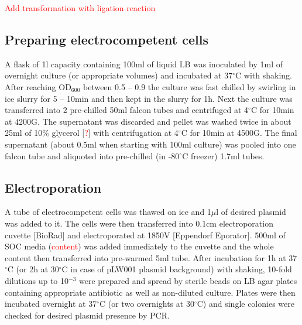 \textcolor{red}{Add transformation with ligation reaction}

\subsection{Preparing electrocompetent cells}
A flask of 1l capacity containing 100ml of liquid LB was inoculated by 1ml of overnight culture (or appropriate volumes) and incubated at 37$^{\circ}$C with shaking.
After reaching OD$_{600}$ between 0.5 -- 0.9 the culture was fast chilled by swirling in ice slurry for 5 -- 10min and then kept in the slurry for 1h.
Next the culture was transferred into 2 pre-chilled 50ml falcon tubes and centrifuged  at 4$^{\circ}$C for 10min at 4200G.
The supernatant was discarded and pellet was washed twice in about 25ml of 10\% glycerol [\textcolor{red}{?}] with centrifugation at 4$^{\circ}$C for 10min at 4500G.
The final supernatant (about 0.5ml when starting with 100ml culture) was pooled into one falcon tube and aliquoted into pre-chilled (in -80$^{\circ}$C freezer) 1.7ml tubes.

\subsection{Electroporation}
A tube of electrocompetent cells was thawed on ice and 1$\mu$l of desired plasmid was added to it.
The cells were then transferred into 0.1cm electroporation cuvette [BioRad] and electroporated at 1850V [Eppendorf Eporator\textsuperscript{\textregistered}].
500ml of SOC media (\textcolor{red}{content}) was added immediately to the cuvette and the whole content then transferred into pre-warmed 5ml tube.
After incubation for 1h at 37$^{\circ}$C (or 2h at 30$^{\circ}$C in case of pLW001 plasmid background) with shaking, 10-fold dilutions up to 10$^{-3}$ were prepared and spread by sterile beads on LB agar plates containing appropriate antibiotic as well as non-diluted culture.
Plates were then incubated overnight at 37$^{\circ}$C (or two overnights at 30$^{\circ}$C) and single colonies were checked for desired plasmid presence by PCR.

